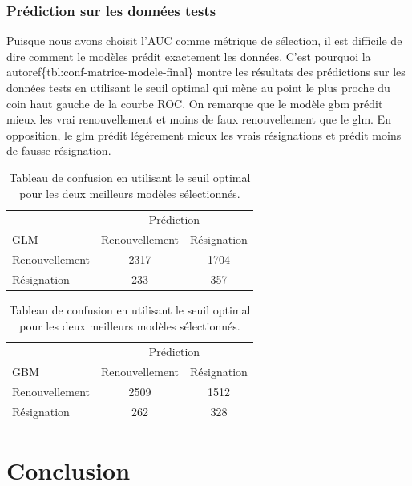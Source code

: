 \documentclass[]{article}
\begin{document}
\subsubsection{Prédiction sur les données
tests}\label{pruxe9diction-sur-les-donnuxe9es-tests}

Puisque nous avons choisit l'AUC comme métrique de sélection, il est
difficile de dire comment le modèles prédit exactement les données.
C'est pourquoi la autoref\{tbl:conf-matrice-modele-final\} montre les
résultats des prédictions sur les données tests en utilisant le seuil
optimal qui mène au point le plus proche du coin haut gauche de la
courbe ROC. On remarque que le modèle gbm prédit mieux les vrai
renouvellement et moins de faux renouvellement que le glm. En
opposition, le glm prédit légérement mieux les vrais résignations et
prédit moins de fausse résignation.

\begin{table}[!ht]
\centering
\caption{Tableau de confusion en utilisant le seuil optimal pour les deux 
meilleurs modèles sélectionnés.}
\label{tbl:conf-matrice-modele-final}
\begin{minipage}{0.48\linewidth}
\begin{tabular}{l|cc}
\multicolumn{1}{c}{} & \multicolumn{2}{c}{Prédiction} \\
GLM & Renouvellement & Résignation \\
\hline
Renouvellement & 2317 & 1704 \\
Résignation    & 233 & 357 \\
\hline
\end{tabular}
\end{minipage}
\hfill
\begin{minipage}{0.48\linewidth}
\begin{tabular}{l|cc}
\multicolumn{1}{c}{} & \multicolumn{2}{c}{Prédiction} \\
GBM & Renouvellement & Résignation \\
\hline
Renouvellement & 2509 & 1512 \\
Résignation    & 262 & 328 \\
\hline
\end{tabular}
\end{minipage}
\end{table}

\newpage

\section{Conclusion}\label{conclusion}
\end{document}
